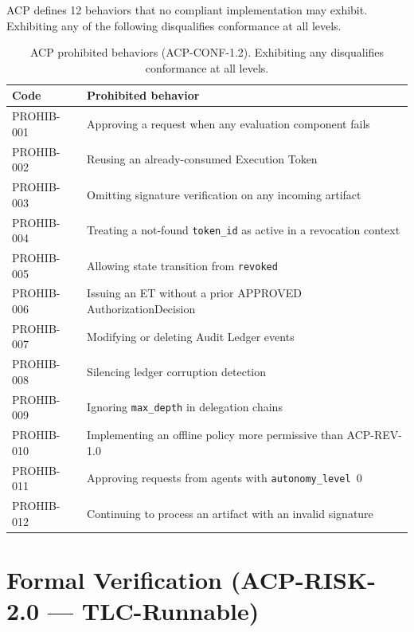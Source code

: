\documentclass[11pt]{article}
\theoremstyle{definition}
\begin{document}
ACP defines 12 behaviors that no compliant implementation may exhibit.
Exhibiting any of the following disqualifies conformance at all levels.

\begin{table}[h!]
\centering
\small
\begin{tabular}{@{}ll@{}}
\toprule
\textbf{Code} & \textbf{Prohibited behavior} \\
\midrule
PROHIB-001 & Approving a request when any evaluation component fails \\
PROHIB-002 & Reusing an already-consumed Execution Token \\
PROHIB-003 & Omitting signature verification on any incoming artifact \\
PROHIB-004 & Treating a not-found \texttt{token\_id} as active in a revocation context \\
PROHIB-005 & Allowing state transition from \texttt{revoked} \\
PROHIB-006 & Issuing an ET without a prior APPROVED AuthorizationDecision \\
PROHIB-007 & Modifying or deleting Audit Ledger events \\
PROHIB-008 & Silencing ledger corruption detection \\
PROHIB-009 & Ignoring \texttt{max\_depth} in delegation chains \\
PROHIB-010 & Implementing an offline policy more permissive than ACP-REV-1.0 \\
PROHIB-011 & Approving requests from agents with \texttt{autonomy\_level}~0 \\
PROHIB-012 & Continuing to process an artifact with an invalid signature \\
\bottomrule
\end{tabular}
\caption{ACP prohibited behaviors (ACP-CONF-1.2). Exhibiting any disqualifies conformance at all levels.}
\label{tab:prohib}
\end{table}

\section{Formal Verification (ACP-RISK-2.0 — TLC-Runnable)}
\label{app:tlaplus}
\end{document}
